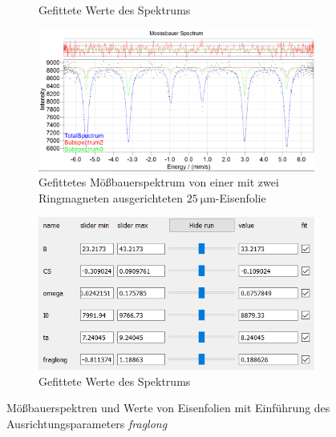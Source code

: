 \documentclass[german, %
parskip=full, %
bibliography=totoc, %
]{scrartcl}
\begin{document}
\begin{figure}[ht]
\begin{subfigure}[b]{0.4\textwidth}
	  \caption{Gefittete Werte des Spektrums}
	  \label{fig:werte25geradefr}
  \end{subfigure}
	\begin{subfigure}[b]{0.5\textwidth}
		\includegraphics[width=\textwidth]{MoessbauerEisen25MagnetRingfrag}
	  \caption{Gefittetes Mößbauerspektrum von einer mit zwei Ringmagneten ausgerichteten \(\SI{25}{\micro\meter}\)-Eisenfolie}
	  \label{fig:moess25ringfr}
  \end{subfigure}
  \begin{subfigure}[b]{0.4\textwidth}
	  \includegraphics[width=\textwidth]{WerteEisen25MagnetRingfrag}
	  \caption{Gefittete Werte des Spektrums}
	  \label{fig:werte25ringfr}
  \end{subfigure}
	\caption{Mößbauerspektren und Werte von Eisenfolien mit Einführung des Ausrichtungsparameters \textit{fraglong}}
	\label{fig:eisenfr}
\end{figure}
\end{document}
